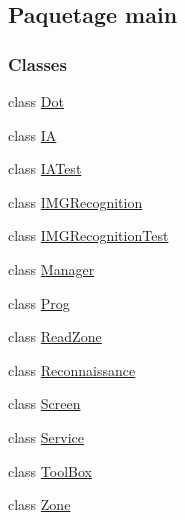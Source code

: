 \hypertarget{namespacemain}{}\subsection{Paquetage main}
\label{namespacemain}
\subsubsection*{Classes}
\begin{DoxyCompactItemize}
\item 
class \hyperlink{classmain_1_1Dot}{Dot}
\item 
class \hyperlink{classmain_1_1IA}{I\+A}
\item 
class \hyperlink{classmain_1_1IATest}{I\+A\+Test}
\item 
class \hyperlink{classmain_1_1IMGRecognition}{I\+M\+G\+Recognition}
\item 
class \hyperlink{classmain_1_1IMGRecognitionTest}{I\+M\+G\+Recognition\+Test}
\item 
class \hyperlink{classmain_1_1Manager}{Manager}
\item 
class \hyperlink{classmain_1_1Prog}{Prog}
\item 
class \hyperlink{classmain_1_1ReadZone}{Read\+Zone}
\item 
class \hyperlink{classmain_1_1Reconnaissance}{Reconnaissance}
\item 
class \hyperlink{classmain_1_1Screen}{Screen}
\item 
class \hyperlink{classmain_1_1Service}{Service}
\item 
class \hyperlink{classmain_1_1ToolBox}{Tool\+Box}
\item 
class \hyperlink{classmain_1_1Zone}{Zone}
\end{DoxyCompactItemize}
